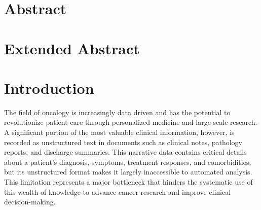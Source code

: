 \documentclass[12pt, a4paper]{article}
\begin{document}
\section*{Abstract}

\section*{Extended Abstract}

\newpage
\tableofcontents

\newpage
\section{Introduction}
The field of oncology is increasingly data driven and has the potential to revolutionize patient care through personalized medicine and large-scale research. A significant portion of the most valuable clinical information, however, is recorded as unstructured text in documents such as clinical notes, pathology reports, and discharge summaries. This narrative data contains critical details about a patient's diagnosis, symptoms, treatment responses, and comorbidities, but its unstructured format makes it largely inaccessible to automated analysis. This limitation represents a major bottleneck that hinders the systematic use of this wealth of knowledge to advance cancer research and improve clinical decision-making.
\end{document}

